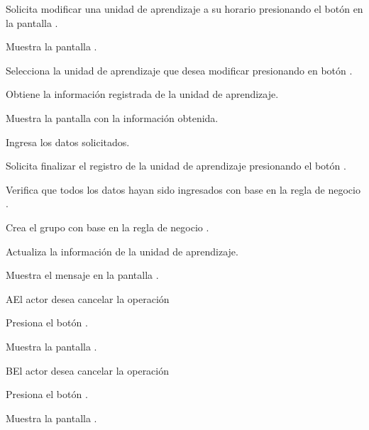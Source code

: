 \begin{UCtrayectoria}

    \UCpaso[\UCactor] Solicita modificar una unidad de aprendizaje a su horario presionando el botón \btnEditar en la pantalla .
    
    \UCpaso[\UCsist] Muestra la pantalla .
    
    \UCpaso[\UCactor] Selecciona la unidad de aprendizaje que desea modificar presionando en botón \btnArrowRigth. 
    
    \UCpaso[\UCsist] Obtiene la información registrada de la unidad de aprendizaje.
        
    \UCpaso[\UCsist] Muestra la pantalla  con la información obtenida.
    
    \UCpaso[\UCactor] \label{CUH1.3:Registrar} Ingresa los datos solicitados. 
    
    \UCpaso[\UCactor] Solicita finalizar el registro de la unidad de aprendizaje presionando el botón .
    
    \UCpaso[\UCsist] Verifica que todos los datos hayan sido ingresados con base en la regla de negocio . 
    
    \UCpaso[\UCsist] Crea el grupo con base en la regla de negocio .
    
    \UCpaso[\UCsist] Actualiza la información de la unidad de aprendizaje. 
    
    \UCpaso[\UCsist] Muestra el mensaje  en la pantalla .
        
\end{UCtrayectoria}


\begin{UCtrayectoriaA}{A}{El actor desea cancelar la operación}
	
	\UCpaso[\UCactor] Presiona el botón \btnEditar.
	
	\UCpaso[\UCsist] Muestra la pantalla .
		
\end{UCtrayectoriaA}

\begin{UCtrayectoriaA}{B}{El actor desea cancelar la operación}
	
	\UCpaso[\UCactor] Presiona el botón .
	
	\UCpaso[\UCsist] Muestra la pantalla .
		
\end{UCtrayectoriaA}


